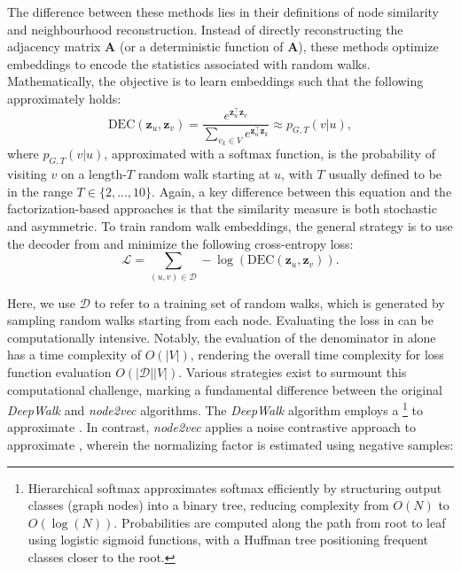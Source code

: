 The difference between these methods lies in their definitions of node similarity and neighbourhood reconstruction. Instead of directly reconstructing the adjacency matrix $ \mathbf{A} $ (or a deterministic function of $ \mathbf{A} $), these methods optimize embeddings to encode the statistics associated with random walks. Mathematically, the objective is to learn embeddings such that the following approximately holds:
\begin{equation}\label{eq:randomWalkdec}
    \text{DEC}(\mathbf{z}_u, \mathbf{z}_v) = \frac{e^{\mathbf{z}_u^\top\mathbf{z}_v}}{\sum_{v_k\in V} e^{\mathbf{z}_u^\top\mathbf{z}_k}} \approx p_{G,T}(v|u),
\end{equation}
where $p_{G,T}(v|u)$, approximated with a softmax function, is the probability of visiting $v$ on a length-$T$ random walk starting at $u$, with $T$ usually defined to be in the range $T\in\{2,...,10\}$. Again, a key difference between this equation and the factorization-based approaches is that the similarity measure is both stochastic and asymmetric.
To train random walk embeddings, the general strategy is to use the decoder from  and minimize the following cross-entropy loss:
\begin{equation}\label{eq:randomWalkloss}
    \mathcal{L} = \sum_{(u,v)\in\mathcal{D}} -\log(\text{DEC}(\mathbf{z}_u, \mathbf{z}_v)).
\end{equation}

Here, we use $\mathcal{D}$ to refer to a training set of random walks, which is generated by sampling random walks starting from each node.
Evaluating the loss in  can be computationally intensive. Notably, the evaluation of the denominator in  alone has a time complexity of $ O(|V|) $, rendering the overall time complexity for loss function evaluation $ O(|\mathcal{D}||V|) $. Various strategies exist to surmount this computational challenge, marking a fundamental difference between the original \textit{DeepWalk} and \textit{node2vec} algorithms. The \textit{DeepWalk} algorithm employs a \footnote{Hierarchical softmax approximates softmax efficiently by structuring output classes (graph nodes) into a binary tree, reducing complexity from $ O(N) $ to $ O(\log(N)) $. Probabilities are computed along the path from root to leaf using logistic sigmoid functions, with a Huffman tree positioning frequent classes closer to the root.} to approximate . In contrast, \textit{node2vec} applies a noise contrastive approach to approximate , wherein the normalizing factor is estimated using negative samples:

